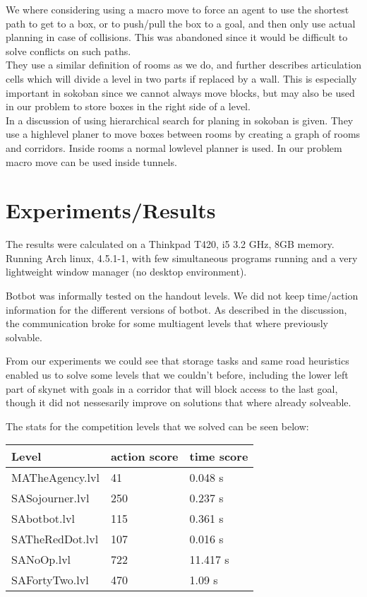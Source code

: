 \documentclass[letterpaper]{article}
\begin{document}
We where considering using a macro move to force an agent to use the shortest
path to get to a box, or to push/pull the box to a goal, and then only use actual
planning in case of collisions. This was abandoned since it would be difficult
to solve conflicts on such paths.\\

They use a similar definition of rooms as we do, and further describes articulation
cells which will divide a level in two parts if replaced by a wall. This is
especially important in sokoban since we cannot always move blocks, but may
also be used in our problem to store boxes in the right side of a level.\\

In \cite{highlevelSokoban} a discussion of using hierarchical search for
planing in sokoban is given. They use a highlevel planer to move boxes between
rooms by creating a graph of rooms and corridors. Inside rooms a normal lowlevel
planner is used. In our problem macro move can be used inside tunnels.

\section{Experiments/Results}
The results were calculated on a Thinkpad T420, i5 3.2 GHz, 8GB memory.
Running Arch linux, 4.5.1-1, with few simultaneous programs running and a very
lightweight window manager (no desktop environment).

Botbot was informally tested on the handout levels. We did not keep time/action
information for the different versions of botbot. As described in the discussion,
the communication broke for some multiagent levels that where previously solvable.

From our experiments we could see that storage tasks and same road heuristics enabled
us to solve some levels that we couldn't before, including the lower left part of skynet
with goals in a corridor that will block access to the last goal, though it did not
nessesarily improve on solutions that where already solveable.

The stats for the competition levels that we solved can be seen below:\\

\begin{tabular}{l|l|l}
Level & action score & time score \\
\hline
MATheAgency.lvl & 41 & 0.048 s\\
\hline
SASojourner.lvl & 250 & 0.237 s\\
SAbotbot.lvl & 115 & 0.361 s\\
SATheRedDot.lvl & 107 & 0.016 s\\
SANoOp.lvl & 722 &11.417 s\\
SAFortyTwo.lvl & 470 & 1.09 s\
\end{tabular}\\
\end{document}
